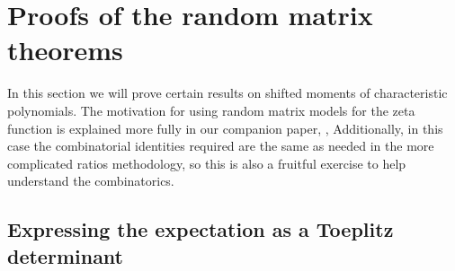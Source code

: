 \documentclass[12pt,a4paper,reqno]{amsart}
\theoremstyle{remark}
\numberwithin{equation}{section}
\begin{document}
\section{Proofs of the random matrix theorems}\label{sect:RMTMot}

In this section we will prove certain results on shifted moments of characteristic polynomials. The motivation for using random matrix models for the zeta function is explained more fully in our companion paper, \cite{HugPC24}, Additionally, in this case the combinatorial identities required are the same as needed in the more complicated ratios methodology, so this is also a fruitful exercise to help understand the combinatorics.

\subsection{Expressing the expectation as a Toeplitz determinant} \hfill
\end{document}
